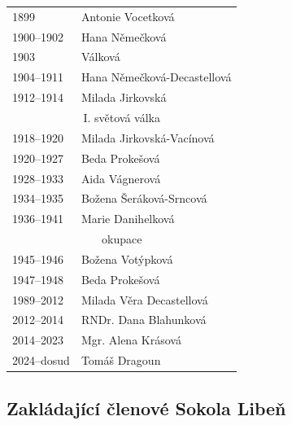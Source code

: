 \documentclass[a5paper, 11pt, twoside]{article}
\begin{document}
\begin{multicols}{2}
\begin{tabular}[]{l >{\raggedright\arraybackslash}p{3cm}}
1899 & Antonie Vocetková \\
1900--1902 & Hana Němečková \\
1903 & Válková \\
1904--1911 & Hana Němečková-Decastellová \\
1912--1914 & Milada Jirkovská \\[6pt]
\multicolumn{2}{c}{I. světová válka} \\[6pt]
1918--1920 & Milada Jirkovská-Vacínová \\
1920--1927 & Beda Prokešová \\
1928--1933 & Aida Vágnerová \\
1934--1935 & Božena Šeráková-Srncová \\
1936--1941 & Marie Danihelková \\[6pt]
\multicolumn{2}{c}{okupace} \\[6pt]
1945--1946 & Božena Votýpková \\
1947--1948 & Beda Prokešová \\
1989--2012 & Milada Věra Decastellová \\
2012--2014 & RNDr. Dana Blahunková \\
2014--2023 & Mgr. Alena Krásová \\
2024--dosud & Tomáš Dragoun \\
\end{tabular}

\end{multicols}

\clearpage
\subsection{Zakládající členové Sokola Libeň}
\end{document}
